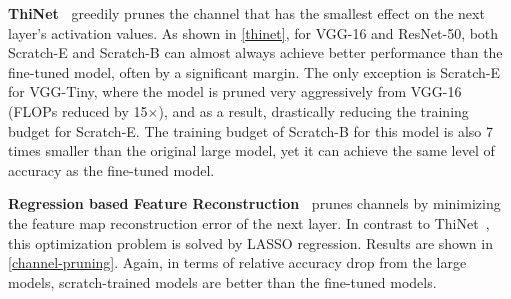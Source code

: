 \textbf{ThiNet~\cite{luo2017thinet}} greedily prunes the channel that has the smallest effect on the next layer's activation values.  As shown in \autoref{thinet}, for VGG-16 and ResNet-50, both Scratch-E and Scratch-B can almost always achieve better performance than the fine-tuned model, often by a significant margin. The only exception is Scratch-E for VGG-Tiny, where the model is pruned very aggressively from VGG-16 (FLOPs reduced by 15$\times$), and as a result, drastically reducing the training budget for Scratch-E. The training budget of Scratch-B for this model is also 7 times smaller than the original large model, yet it can achieve the same level of accuracy as the fine-tuned model.


\textbf{Regression based Feature Reconstruction~\cite{he2017channel}} prunes channels by minimizing the feature map reconstruction error of the next layer. In contrast to ThiNet~\cite{luo2017thinet}, this optimization problem is solved by LASSO regression. Results are shown in \autoref{channel-pruning}. Again, in terms of relative accuracy drop from the large models, scratch-trained models are better than the fine-tuned models.


\renewcommand{\arraystretch}{1.2}
\begin{table}[!htbp]
\small
\centering
{}
\caption{Results (accuracy) for Regression based Feature Reconstruction~\cite{he2017channel}. Pruned models such as ``VGG-16-5x'' are defined in~\cite{he2017channel}. Similar to \autoref{thinet}, we compare relative accuracy drop from unpruned large models.}
\label{channel-pruning}
\end{table}

